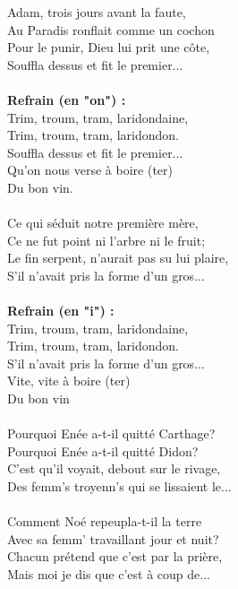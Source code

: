 
 Adam, trois jours avant la faute,
\\Au Paradis ronflait comme un cochon
\\Pour le punir, Dieu lui prit une côte,
\\Souffla dessus et fit le premier...
\\\\\textbf{Refrain (en "on") :}
\\Trim, troum, tram, laridondaine,
\\Trim, troum, tram, laridondon.
\\Souffla dessus et fit le premier...
\\Qu'on nous verse à boire (ter)
\\Du bon vin.
\\\\Ce qui séduit notre première mère,
\\Ce ne fut point ni l'arbre ni le fruit;
\\Le fin serpent, n'aurait pas su lui plaire,
\\S'il n'avait pris la forme d'un gros...
\\\\\textbf{Refrain (en "i") :}
\\Trim, troum, tram, laridondaine,
\\Trim, troum, tram, laridondon.
\\S'il n'avait pris la forme d'un gros...
\\Vite, vite à boire (ter)
\\Du bon vin
\\\\Pourquoi Enée a-t-il quitté Carthage?
\\Pourquoi Enée a-t-il quitté Didon?
\\C'est qu'il voyait, debout sur le rivage,
\\Des femm's troyenn's qui se lissaient le...
\\\\Comment Noé repeupla-t-il la terre
\\Avec sa femm' travaillant jour et nuit?
\\Chacun prétend que c'est par la prière,
\\Mais moi je dis que c'est à coup de...

